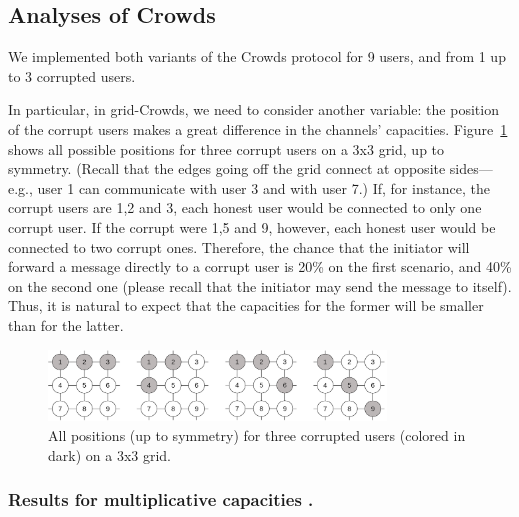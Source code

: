 \subsection{Analyses of Crowds}

We implemented both variants of the Crowds protocol for 9 users, 
and from 1 up to 3 corrupted users. 

In particular, in grid-Crowds, we need to consider another variable: the position 
of the corrupt users makes a great difference in the channels' capacities.
Figure~\ref{figure:positions} shows all possible 
positions for three corrupt users on a 3x3 grid, up to symmetry. 
(Recall that the edges going off the grid connect at opposite 
sides---e.g., user 1 can communicate with user 3 and with user 7.)
If, for instance, the corrupt users are 1,2 and 3, each 
honest user would be connected to only one corrupt user. 
If the corrupt were 1,5 and 9, however, each honest user would be 
connected to two corrupt ones. 
Therefore, the chance that the initiator will 
forward a message directly to a corrupt user is 20\% on the first scenario, 
and 40\% on the second one (please recall that the initiator may send the 
message to itself). 
Thus, it is natural to expect that the capacities for the former
will be smaller than for the latter.

\begin{figure}[ht]
\centering
\includegraphics[width=0.8\textwidth]{figures/positions.png}
\caption{All positions (up to symmetry) for three corrupted users (colored in dark) on a 3x3 grid. }
\label{figure:positions}
\end{figure}

\subsubsection{Results for multiplicative capacities%
.}

